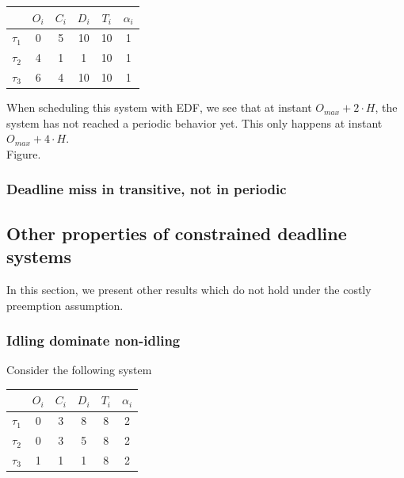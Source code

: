 \documentclass[a4paper,10pt]{article}
\begin{document}
        \begin{center}
            \begin{tabular}{|r|c|c|c|c|c|}
                \hline
                            & $O_i$ & $C_i$ & $D_i$ & $T_i$ & $\alpha_i$ \\ \hline
                $\tau_1$    & 0     & 5     & 10   & 10    & 1     \\ \hline
                $\tau_2$    & 4     & 1     & 1    & 10    & 1     \\ \hline
                $\tau_3$    & 6     & 4     & 10   & 10    & 1     \\ \hline
            \end{tabular}
        \end{center}

        When scheduling this system with EDF, we see that at instant $O_{max} + 2 \cdot H$, the system has not reached a periodic behavior yet. This only happens at instant $O_{max} + 4 \cdot H$.\\

        Figure.

        \subsubsection{Deadline miss in transitive, not in periodic}

    \subsection{Other properties of constrained deadline systems}

    In this section, we present other results which do not hold under the costly preemption assumption.

        \subsubsection{Idling dominate non-idling}

        Consider the following system

        \begin{center}
            \begin{tabular}{|r|c|c|c|c|c|}
                \hline
                            & $O_i$ & $C_i$ & $D_i$ & $T_i$ & $\alpha_i$ \\ \hline
                $\tau_1$    & 0     & 3     & 8    & 8     & 2     \\ \hline
                $\tau_2$    & 0     & 3     & 5    & 8     & 2     \\ \hline
                $\tau_3$    & 1     & 1     & 1    & 8     & 2     \\ \hline
            \end{tabular}
        \end{center}
\end{document}
